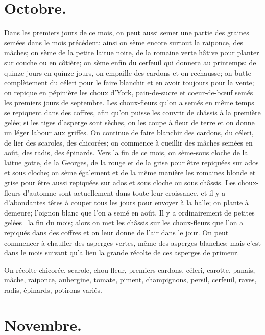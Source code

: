 \documentclass[10pt,a4paper]{book}
\begin{document}
\section{Octobre.}

Dans les premiers jours de ce mois, on peut aussi semer une partie des graines semées dans le mois précédent: ainsi on sème encore surtout la raiponce, des mâches; on sème de la petite laitue noire, de la romaine verte hâtive pour planter sur couche ou en côtière; on sème enfin du cerfeuil qui donnera au printemps: de quinze jours en quinze jours, on empaille des cardons et on rechausse; on butte complètement du céleri pour le faire blanchir et en avoir toujours pour la vente; on repique en pépinière les choux d'York, pain-de-sucre et coeur-de-bœuf semés les premiers jours de septembre. Les choux-fleurs qu'on a semés en même temps se repiquent dans des coffres, afin qu'on puisse les couvrir de châssis à la première gelée; si les tiges d'asperge sont sèches, on les coupe à fleur de terre et on donne un léger labour aux griffes. On continue de faire blanchir des cardons, du céleri, de lier des scaroles, des chicorées; on commence à cueillir des mâches semées en août, des radis, des épinards. Vers la fin de ce mois, on sème-sous cloche de la laitue gotte, de la Georges, de la rouge et de la grise pour être repiquées sur ados et sous cloche; on sème également et de la même manière les romaines blonde et grise pour être aussi repiquées sur ados et sous cloche ou sous châssis. Les choux-fleurs d'automne sont actuellement dans toute leur croissance, et il y a d'abondantes têtes à couper tous les jours pour envoyer à la halle; on plante à demeure; l'oignon blanc que l'on a semé en août. Il y a ordinairement de petites gelées \ la fin du mois; alors on met les châssis sur les choux-fleurs que l'on a repiqués dans des coffres et on leur donne de l'air dans le jour. On peut commencer à chauffer des asperges vertes, même des asperges blanches; mais c'est dans le mois suivant qu'a lieu la grande récolte de ces asperges de primeur.

On récolte chicorée, scarole, chou-fleur, premiers cardons, céleri, carotte, panais, mâche, raiponce, aubergine, tomate, piment, champignons, persil, cerfeuil, raves, radis, épinards, potirons variés.

\section{Novembre.}
\end{document}
